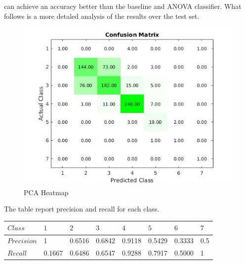 \documentclass[a4paper,10pt]{article}
\begin{document}
      can achieve an accuracy better than the baseline and ANOVA classifier.\newline
      What follows is a more detaled analysis of the results over the test set.
      \begin{figure}[H]
	\centering
	\includegraphics[scale=0.5]{pca-heat.jpg}
	\caption{PCA Heatmap}
      \end{figure}
      The table report precision and recall for each class.
      \begin{table}[H]
      	\centering
	\begin{tabular}{l|P{1cm}P{1cm}P{1cm}P{1cm}P{1cm}P{1cm}P{1cm}} \toprule
	  {$Class$} & {$1$} & {$2$} & {$3$} & {$4$} & {$5$} & {$6$} & {$7$} \\ \midrule
	  $Precision$  & 1  &  0.6516 & 0.6842 & 0.9118 & 0.5429 & 0.3333 & 0.5 \\ \midrule
	  $Recall$  & 0.1667 & 0.6486 & 0.6547 & 0.9288 & 0.7917 & 0.5000 & 1  \\ \bottomrule
	\end{tabular}
      \end{table}
\end{document}
